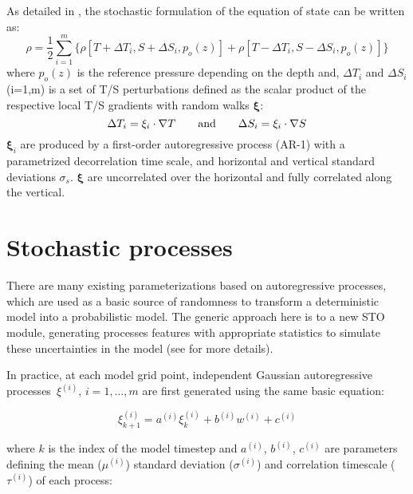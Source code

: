 \documentclass[../main/NEMO_manual]{subfiles}
\begin{document}
As detailed in \cite{brankart_OM13}, the stochastic formulation of the equation of state can be written as:
\begin{equation}
  \label{eq:STO_eos_sto}
  \rho = \frac{1}{2} \sum_{i=1}^m\{ \rho[T+\Delta T_i,S+\Delta S_i,p_o(z)] + \rho[T-\Delta T_i,S-\Delta S_i,p_o(z)] \}
\end{equation}
where $p_o(z)$ is the reference pressure depending on the depth and,
$\Delta T_i$ and $\Delta S_i$ (i=1,m) is a set of T/S perturbations defined as
the scalar product of the respective local T/S gradients with random walks $\mathbf{\xi}$:
\begin{equation}
  \label{eq:STO_sto_pert}
  \Delta T_i = \mathbf{\xi}_i \cdot \nabla T \qquad \hbox{and} \qquad \Delta S_i = \mathbf{\xi}_i \cdot \nabla S
\end{equation}
$\mathbf{\xi}_i$ are produced by a first-order autoregressive process (AR-1) with
a parametrized decorrelation time scale, and horizontal and vertical standard deviations $\sigma_s$.
$\mathbf{\xi}$ are uncorrelated over the horizontal and fully correlated along the vertical.

\section{Stochastic processes}
\label{sec:STO_the_details}

There are many existing parameterizations based on autoregressive processes,
which are used as a basic source of randomness to transform a deterministic model into a probabilistic model.
The generic approach here is to a new STO module,
generating processes features with appropriate statistics to simulate these uncertainties in the model
(see \cite{brankart.candille.ea_GMD15} for more details).

In practice, at each model grid point,
independent Gaussian autoregressive processes~$\xi^{(i)},\,i=1,\ldots,m$ are first generated using
the same basic equation:

\begin{equation}
  \label{eq:STO_autoreg}
  \xi^{(i)}_{k+1} = a^{(i)} \xi^{(i)}_k + b^{(i)} w^{(i)} + c^{(i)}
\end{equation}

\noindent
where $k$ is the index of the model timestep and
$a^{(i)}$, $b^{(i)}$, $c^{(i)}$ are parameters defining the mean ($\mu^{(i)}$) standard deviation ($\sigma^{(i)}$) and
correlation timescale ($\tau^{(i)}$) of each process:
\end{document}
